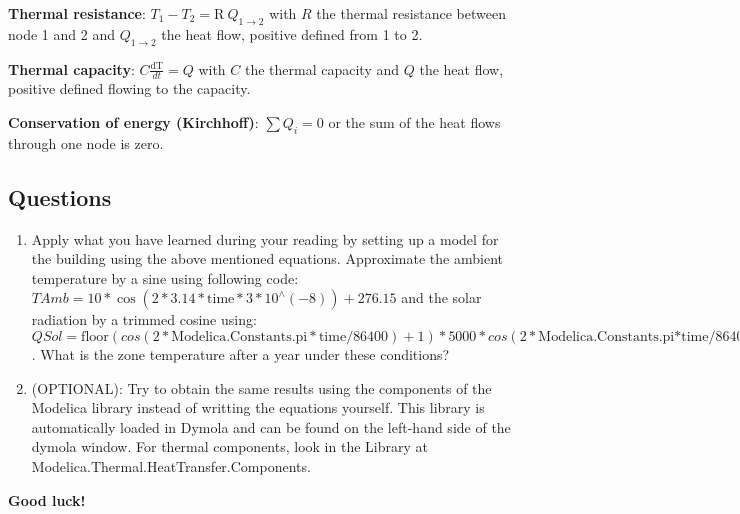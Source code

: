 \documentclass[10pt,a4paper]{article}
\begin{document}
\textbf{Thermal resistance}: $T_1 - T_2 = \text{R} \ Q_{1 \rightarrow 2} $ with $R$ the thermal resistance between node 1 and 2 and $Q_{1\rightarrow 2}$ the heat flow, positive defined from 1 to 2.

\textbf{Thermal capacity}: $C \frac{\text{dT}}{dt} = Q$ with $C$ the thermal capacity and $Q$ the heat flow, positive defined flowing to the capacity.

\textbf{Conservation of energy (Kirchhoff)}: $ \sum Q_i = 0$ or the sum of the heat flows through one node is zero.

\subsection*{Questions}

\begin{enumerate}
\item Apply what you have learned during your reading by setting up a model for the building using the above mentioned equations. Approximate the ambient temperature by a sine using following code: $TAmb = 10*\cos(2*3.14*\text{time}*3*10^\wedge(-8)) + 276.15$ and the solar radiation by a trimmed cosine using: $QSol = \text{floor}(cos(2*\text{Modelica.Constants.pi}*\text{time} / 86400) + 1) * 5000 * cos(2*\text{Modelica.Constants.pi*time} / 86400)$. What is the zone temperature after a year under these conditions?
\item (OPTIONAL): Try to obtain the same results using the components of the Modelica library instead of writting the equations yourself. This library is automatically loaded in Dymola and can be found on the left-hand side of the dymola window. For thermal components, look in the Library at Modelica.Thermal.HeatTransfer.Components.   \linebreak[10]
\end{enumerate}

\begin{center}
 \textbf{Good luck!}
\end{center}
\end{document}
